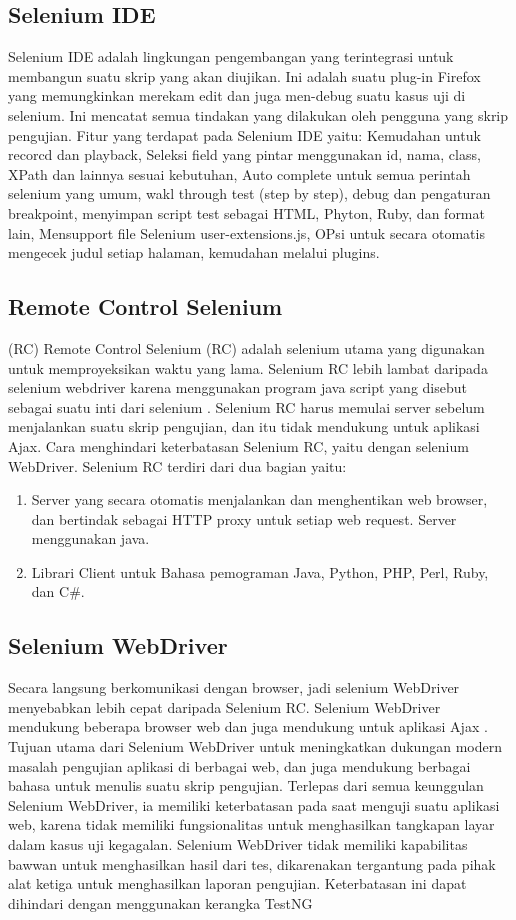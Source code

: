 \subsection{Selenium IDE}
Selenium IDE adalah lingkungan pengembangan yang terintegrasi untuk membangun suatu skrip yang akan diujikan. Ini adalah suatu plug-in Firefox yang memungkinkan merekam edit dan juga men-debug suatu kasus uji di selenium\cite{razak2011agile}. Ini mencatat semua tindakan yang dilakukan oleh pengguna yang skrip pengujian. Fitur yang terdapat pada Selenium IDE yaitu: Kemudahan untuk recorcd dan playback, Seleksi field yang pintar menggunakan id, nama, class, XPath dan lainnya sesuai kebutuhan, Auto complete untuk semua perintah selenium yang umum, wakl through test (step by step), debug dan pengaturan breakpoint, menyimpan script test sebagai HTML, Phyton, Ruby, dan format lain, Mensupport file Selenium user-extensions.js, OPsi untuk secara otomatis mengecek judul setiap halaman, kemudahan melalui plugins.

\subsection{Remote Control Selenium}{(RC)}
Remote Control Selenium (RC) adalah selenium utama yang digunakan untuk memproyeksikan waktu yang lama. Selenium RC lebih lambat daripada selenium webdriver karena menggunakan program java script yang disebut sebagai suatu inti dari selenium \cite{maruyama1994wireless}. Selenium RC harus memulai server sebelum menjalankan suatu skrip pengujian, dan itu tidak mendukung untuk aplikasi Ajax. Cara menghindari keterbatasan Selenium RC, yaitu dengan selenium WebDriver. Selenium RC terdiri dari dua bagian yaitu:
\begin{enumerate}
    \item Server yang secara otomatis menjalankan dan menghentikan web browser, dan bertindak sebagai HTTP proxy untuk setiap web request. Server menggunakan java.
    \item Librari Client untuk Bahasa pemograman Java, Python, PHP, Perl, Ruby, dan C\#.
\end{enumerate}

\subsection{Selenium WebDriver}
Secara langsung berkomunikasi dengan browser, jadi selenium WebDriver menyebabkan lebih cepat daripada Selenium RC. Selenium WebDriver mendukung beberapa browser web dan juga mendukung untuk aplikasi Ajax \cite{razak2011agile}. Tujuan utama dari Selenium WebDriver untuk meningkatkan dukungan modern masalah pengujian aplikasi di berbagai web, dan juga mendukung berbagai bahasa untuk menulis suatu skrip pengujian. Terlepas dari semua keunggulan Selenium WebDriver, ia memiliki keterbatasan pada saat menguji suatu aplikasi web, karena tidak memiliki fungsionalitas untuk menghasilkan tangkapan layar dalam kasus uji kegagalan. Selenium WebDriver tidak memiliki kapabilitas bawwan untuk menghasilkan hasil dari tes, dikarenakan tergantung pada pihak alat ketiga untuk menghasilkan laporan pengujian. Keterbatasan ini dapat dihindari dengan menggunakan kerangka TestNG

